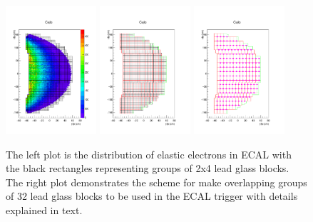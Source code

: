 \documentclass[]{article}
\begin{document}
 
 \begin{figure}
 	\centering
 	\includegraphics[width=0.3\textwidth]{cfpbox.pdf}
 	\includegraphics[width=0.3\textwidth]{cfpc.pdf}
 	 	\includegraphics[width=0.3\textwidth]{cgr32.pdf}
 	 	\caption{The left plot is the distribution of elastic electrons in ECAL with the black rectangles representing
 		groups of 2x4 lead glass blocks. The right plot demonstrates
 		the scheme for make overlapping groups of 32 lead glass blocks to be used in the ECAL trigger with
 		details explained in text.  }\label{fig:ECALTrig}
 \end{figure}
 
\end{document}
